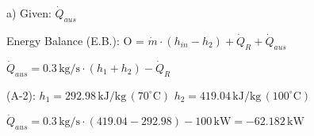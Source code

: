 a) Given: \( \dot{Q}_{aus} \)  

Energy Balance (E.B.):  
O = \( \dot{m} \cdot (h_{in} - h_{2}) + \dot{Q}_R + \dot{Q}_{aus} \)  

\( \dot{Q}_{aus} = 0.3 \, \text{kg/s} \cdot (h_{1} + h_{2}) - \dot{Q}_R \)  

(A-2):  
\( h_{1} = 292.98 \, \text{kJ/kg} \, (70^\circ \text{C}) \)  
\( h_{2} = 419.04 \, \text{kJ/kg} \, (100^\circ \text{C}) \)  

\( \dot{Q}_{aus} = 0.3 \, \text{kg/s} \cdot (419.04 - 292.98) - 100 \, \text{kW} = -62.182 \, \text{kW} \)